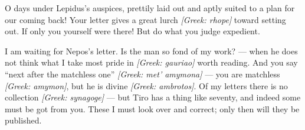  O days under Lepidus's auspices, prettily laid out and aptly suited to a plan for our coming back! Your letter gives a great lurch \textit{[Greek: rhope]} toward setting out. If only you yourself were there! But do what you judge expedient.

 I am waiting for Nepos's letter. Is the man so fond of my work? --- when he does not think what I take most pride in \textit{[Greek: gauriao]} worth reading. And you say ``next after the matchless one'' \textit{[Greek: met' amymona]} --- you are matchless \textit{[Greek: amymon]}, but he is divine \textit{[Greek: ambrotos]}. Of my letters there is no collection \textit{[Greek: synagoge]} --- but Tiro has a thing like seventy, and indeed some must be got from you. These I must look over and correct; only then will they be published.
